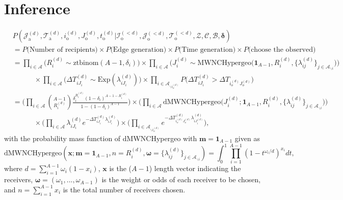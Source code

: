 \documentclass[a4paper]{article}
\begin{document}
\section{Inference}
\begin{equation}
\begin{aligned}
&P(\mathcal{J}^{(d)}_{\mbox{a}}, \mathcal{T}^{(d)}_{\mbox{a}}, i^{(d)}_{\mbox{o}}, J^{(d)}_{\mbox{o}}, t^{(d)}_{\mbox{o}} |\mathcal{I}^{(<d)}_{\mbox{o}}, \mathcal{J}^{(<d)}_{\mbox{o}}, \mathcal{T}^{(<d)}_{\mbox{o}}, \mathcal{Z}, \mathcal{C}, \mathcal{B}, \boldsymbol{\delta})\\&=P\Big(\mbox{Number of recipients}\Big) \times P\Big(\mbox{Edge generation}\Big)\times P\Big(\mbox{Time generation}\Big) \times P\Big(\mbox{choose the observed}\Big) \\&
=\prod_{i\in \mathcal{A}} \Big(R_i^{(d)} \sim \mbox{ztbinom}(A-1, \delta_i)\Big)\times
\prod_{i\in \mathcal{A}}\Big(J_i^{(d)}\sim \mbox{MWNCHypergeo}\Big(\mathbf{1}_{A-1}, R_i^{(d)}, \{\lambda_{ij}^{(d)}\}_{j \in \mathcal{A}_{\backslash i}} \Big)\Big) \\&\quad\quad\quad\times \prod_{i\in \mathcal{A}}\Big(\Delta T^{(d)}_{iJ_i}\sim\mbox{Exp}(\lambda^{(d)}_{iJ_i})\Big) \times \prod_{i\in \mathcal{A}_{\backslash i_o^{(d)}}} P\Big(\Delta T^{(d)}_{i{J_i}} > \Delta T_{i_{o}^{(d)}{J_{o}^{(d)}}}\Big)\\&=\Big(\prod_{i\in \mathcal{A}} {{A-1}\choose R_i^{(d)}} \frac{\delta_i^{ R_i^{(d)}} (1-\delta_i)^{A-1-R_i^{(d)}}}{1 - (1-\delta_i)^{A-1}}\Big) \times \Big(\prod_{i\in \mathcal{A}}\mbox{dMWNCHypergeo}\Big(J_i^{(d)}; \mathbf{1}_{A-1}, R_i^{(d)}, \{\lambda_{ij}^{(d)}\}_{j \in \mathcal{A}_{\backslash i}}\Big)\Big)\\&\quad\quad\quad
\times \Big(\prod_{i \in\mathcal{A}}\lambda^{(d)}_{iJ_i}e^{-\Delta T^{(d)}_{iJ_i}\lambda^{(d)}_{iJ_i}}\Big)\times \Big( \prod_{i\in \mathcal{A}_{\backslash i_o^{(d)}}} e^{-\Delta T^{(d)}_{i_o^{(d)}J_o^{(d)}}\lambda^{(d)}_{iJ^{(d)}_{i}}}\Big),
\end{aligned}
\end{equation}
with the probability mass function of dMWNCHypergeo with $\boldsymbol{m} =\mathbf{1}_{A-1}$ given as
\begin{equation*}
\mbox{dMWNCHypergeo}(\boldsymbol{x}; \boldsymbol{m} =\mathbf{1}_{A-1}, n = R_i^{(d)}, \boldsymbol{\omega} = \{\lambda_{ij}^{(d)}\}_{j \in \mathcal{A}_{\backslash i}}) = \int_0^1\prod_{i=1}^{A-1}(1-t^{\omega_i / d})^{x_i}dt,
\end{equation*}
where $d = \sum_{i = 1}^{A-1} \omega_i(1-x_i)$, $\boldsymbol{x}$ is the ($A-1$) length vector indicating the receivers, $\boldsymbol{\omega} =(\omega_1,...,\omega_{A-1})$ is the weight or odds of each receiver to be chosen, and $n = \sum_{i= 1} ^{A-1} x_i$ is the total number of receivers chosen. 
\end{document}
